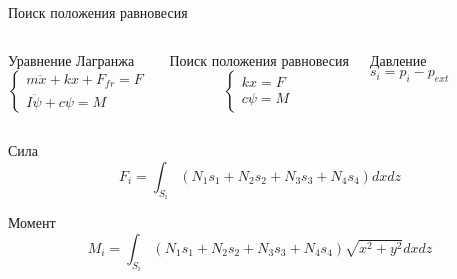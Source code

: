 \documentclass[ignoreonframetext,unicode]{beamer}
\begin{document}
\begin{frame}{Поиск положения равновесия}
	
	\vspace*{-3mm}
		\begin{columns}
	
	
			\begin{block}{Уравнение Лагранжа}
				\vspace*{-4mm}
			\begin{equation*}
				\begin{cases*}
					m \ddot{x} + k x + F_{fr} = F \\
					I \ddot{\psi} + c \psi = M
				\end{cases*}
				\label{lagrsdfdsfsange_fin}
			\end{equation*}
			\end{block}

			\begin{block}{Поиск положения равновесия}
			\begin{equation*}
				\begin{cases*}
					k x = F \\
					c \psi = M
				\end{cases*}
				\label{temp_ldsfsdfsdfagr}
			\end{equation*}
			\end{block}
	
	
			\begin{block}{Давление}
				\vspace*{2mm}
				\begin{equation*}
					s_i = p_i - p_{ext}
					\label{kjdsbafabjb}
				\end{equation*}
			\end{block}
		
\end{columns}

	\vspace*{-2mm}
	\begin{block}{Сила}
	\begin{equation*}
		F_i = \int_{S_i} { \left( N_1 s_1 + N_2 s_2 + N_3 s_3 + N_4 s_4 \right)  dx dz}
	\end{equation*}
	\end{block}

	\vspace*{-2mm}
	\begin{block}{Момент}
	\begin{equation*}
		M_i = \int_{S_i} { \left( N_1 s_1 + N_2 s_2 + N_3 s_3 + N_4 s_4 \right) \sqrt{x^2 + y^2}  dx dz}
	\end{equation*}
	\end{block}


\end{frame}
\end{document}
